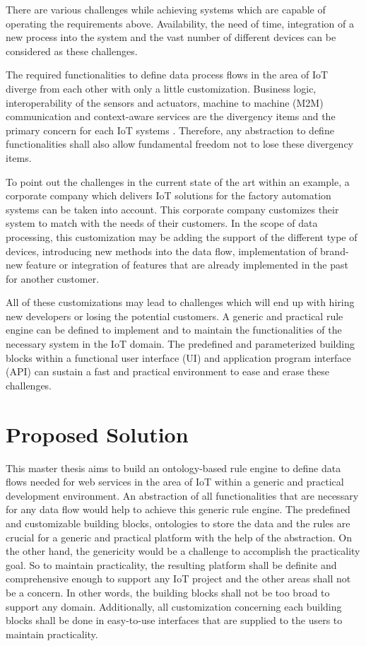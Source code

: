 There are various challenges while achieving systems which are capable of operating the requirements above. Availability, the need of time, integration of a new process into the system and the vast number of different devices can be considered as these challenges.

The required functionalities to define data process flows in the area of IoT diverge from each other with only a little customization. Business logic, interoperability of the sensors and actuators, machine to machine (M2M) communication and context-aware services are the divergency items and the primary concern for each IoT systems \cite{6651222}. Therefore, any abstraction to define functionalities shall also allow fundamental freedom not to lose these divergency items.

To point out the challenges in the current state of the art within an example, a corporate company which delivers IoT solutions for the factory automation systems can be taken into account. This corporate company customizes their system to match with the needs of their customers. In the scope of data processing, this customization may be adding the support of the different type of devices, introducing new methods into the data flow, implementation of brand-new feature or integration of features that are already implemented in the past for another customer.

All of these customizations may lead to challenges which will end up with hiring new developers or losing the potential customers. A generic and practical rule engine can be defined to implement and to maintain the functionalities of the necessary system in the IoT domain. The predefined and parameterized building blocks within a functional user interface (UI) and application program interface (API) can sustain a fast and practical environment to ease and erase these challenges.

\section{Proposed Solution}

This master thesis aims to build an ontology-based rule engine to define data flows needed for web services in the area of IoT within a generic and practical development environment. An abstraction of all functionalities that are necessary for any data flow would help to achieve this generic rule engine. The predefined and customizable building blocks, ontologies to store the data and the rules are crucial for a generic and practical platform with the help of the abstraction. On the other hand, the genericity would be a challenge to accomplish the practicality goal. So to maintain practicality, the resulting platform shall be definite and comprehensive enough to support any IoT project and the other areas shall not be a concern. In other words, the building blocks shall not be too broad to support any domain. Additionally, all customization concerning each building blocks shall be done in easy-to-use interfaces that are supplied to the users to maintain practicality. 

